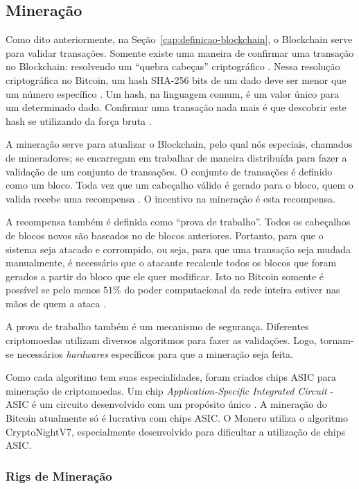 \documentclass[
article,			%
12pt,				%
openright,			%
oneside,			%
a4paper,			%
chapter=TITLE,		%
section=TITLE,		%
subsection=TITLE,	%
subsubsection=TITLE,%
subsubsubsection=TITLE, %
english,			%
brazil,				%
]{abntex2}
\begin{document}
\subsection{Mineração}

Como dito anteriormente, na Seção~\ref{cap:definicao-blockchain}, o
Blockchain serve para validar transações. Somente existe uma maneira
de confirmar uma transação no Blockchain: resolvendo um ``quebra
cabeças'' criptográfico \cite{Weber2012}. Nessa resolução
criptográfica no Bitcoin, um hash SHA-256 bits de um dado deve ser
menor que um número específico \cite{Dev2014}. Um hash, na linguagem
comum, é um valor único para um determinado dado.  Confirmar uma
transação nada mais é que descobrir este hash se utilizando da força
bruta \cite{Arsov}.

A mineração serve para atualizar o Blockchain, pelo qual nós
especiais, chamados de mineradores; se encarregam em trabalhar de
maneira distribuída para fazer a validação de um conjunto de
transações. O conjunto de transações é definido como um bloco. Toda
vez que um cabeçalho válido é gerado para o bloco, quem o valida
recebe uma recompensa \cite{LChicarino}. O incentivo na mineração é
esta recompensa.

A recompensa também é definida como ``prova de trabalho''. Todos os
cabeçalhos de blocos novos são baseados no de blocos anteriores.
Portanto, para que o sistema seja atacado e corrompido, ou seja, para
que uma transação seja mudada manualmente, é necessário que o atacante
recalcule todos os blocos que foram gerados a partir do bloco que ele
quer modificar. Isto no Bitcoin somente é possível se pelo menos
$51\%$ do poder computacional da rede inteira estiver nas mãos de quem
a ataca \cite{Nakamoto2008, Dev2014}.

A prova de trabalho também é um mecanismo de segurança. Diferentes
criptomoedas utilizam diversos algoritmos para fazer as validações.
Logo, tornam-se necessários \emph{hardwares} específicos para que a
mineração seja feita.

Como cada algoritmo tem suas especialidades, foram criados chips ASIC
para mineração de criptomoedas. Um chip \emph{Application-Specific
Integrated Circuit} - ASIC é um circuito desenvolvido com um propósito
único \cite{Smith1997}. A mineração do Bitcoin atualmente só é
lucrativa com chips ASIC\@. O Monero utiliza o algoritmo
CryptoNightV7, especialmente desenvolvido para dificultar a utilização
de chips ASIC\@ \cite{NiceHash2018}.

\subsubsection{Rigs de Mineração}
\end{document}
